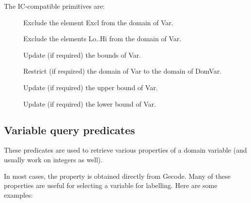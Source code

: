 The IC-compatible primitives are:

\begin{description}
\item[]
Exclude the element Excl from the domain of Var.

\item[]
Exclude the elements Lo..Hi from the domain of Var.

\item[]
Update (if required) the bounds of Var.

\item[]
Restrict (if required) the domain of Var to the domain of DomVar.

\item[]
Update (if required) the upper bound of Var.

\item[]
Update (if required) the lower bound of Var.

\end{description}


\subsection{Variable query predicates}
\label{gfdvarquery}

These predicates are used to retrieve various properties of a domain variable 
(and usually work on integers as well). 

In most cases, the property is obtained directly from Gecode. Many of these
properties are useful for selecting a variable for labelling. Here are some
examples:

